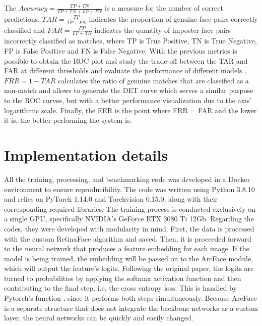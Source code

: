 \documentclass[class=report, crop=false, a4paper, 12pt]{standalone}
\begin{document}
\par The $Accuracy=\frac{TP+TN}{TP+TN+FP+FN}$ is a measure for the number of correct predictions, $TAR=\frac{TP}{TP+FN}$ indicates the proportion of genuine face pairs correctly classified and $FAR=\frac{FP}{FP+TN}$ indicates the quantity of imposter face pairs incorrectly classified as matches, where TP is True Positive, TN is True Negative, FP is False Positive and FN is False Negative. With the previous metrics is possible to obtain the ROC plot and study the trade-off between the TAR and FAR at different thresholds and evaluate the performance of different models . $FRR = 1 - TAR$ calculates the ratio of genuine matches that are classified as a non-match and allows to generate the DET curve which serves a similar purpose to the ROC curves, but with a better performance visualization due to the axis' logarithmic scale. Finally, the EER is the point where FRR = FAR and the lower it is, the better performing the system is. 

\section{Implementation details}
\par All the training, processing, and benchmarking code was developed in a Docker environment to ensure reproducibility. The code was written using Python 3.8.10 and relies on PyTorch 1.14.0 and Torchvision 0.15.0, along with their corresponding required libraries. The training process is conducted exclusively on a single GPU, specifically NVIDIA's GeForce RTX 3080 Ti 12Gb. Regarding the codes, they were developed with modularity in mind. First, the data is processed with the custom RetinaFace algorithm and saved. Then, it is proceeded forward to the neural network that produces a feature embedding for each image. If the model is being trained, the embedding will be passed on to the ArcFace module, which will output the feature's logits. Following the original paper, the logits are turned to probabilities by applying the softmax activation function and then contributing to the final step, i.e, the cross entropy loss. This is handled by Pytorch's function , since it performs both steps simultaneously. Because ArcFace is a separate structure that does not integrate the backbone networks as a custom layer, the neural networks can be quickly and easily changed.
\end{document}
